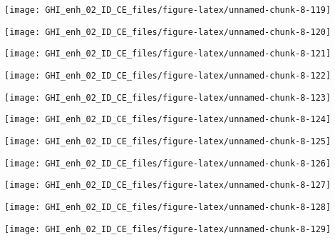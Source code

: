 \documentclass[
  10pt,
  a4paper,oneside]{article}
\begin{document}
\begin{center}\texttt{[image: GHI\_enh\_02\_ID\_CE\_files/figure-latex/unnamed-chunk-8-119]} \end{center}

\begin{center}\texttt{[image: GHI\_enh\_02\_ID\_CE\_files/figure-latex/unnamed-chunk-8-120]} \end{center}

\begin{center}\texttt{[image: GHI\_enh\_02\_ID\_CE\_files/figure-latex/unnamed-chunk-8-121]} \end{center}

\begin{center}\texttt{[image: GHI\_enh\_02\_ID\_CE\_files/figure-latex/unnamed-chunk-8-122]} \end{center}

\begin{center}\texttt{[image: GHI\_enh\_02\_ID\_CE\_files/figure-latex/unnamed-chunk-8-123]} \end{center}

\begin{center}\texttt{[image: GHI\_enh\_02\_ID\_CE\_files/figure-latex/unnamed-chunk-8-124]} \end{center}

\begin{center}\texttt{[image: GHI\_enh\_02\_ID\_CE\_files/figure-latex/unnamed-chunk-8-125]} \end{center}

\begin{center}\texttt{[image: GHI\_enh\_02\_ID\_CE\_files/figure-latex/unnamed-chunk-8-126]} \end{center}

\begin{center}\texttt{[image: GHI\_enh\_02\_ID\_CE\_files/figure-latex/unnamed-chunk-8-127]} \end{center}

\begin{center}\texttt{[image: GHI\_enh\_02\_ID\_CE\_files/figure-latex/unnamed-chunk-8-128]} \end{center}

\begin{center}\texttt{[image: GHI\_enh\_02\_ID\_CE\_files/figure-latex/unnamed-chunk-8-129]} \end{center}
\end{document}
